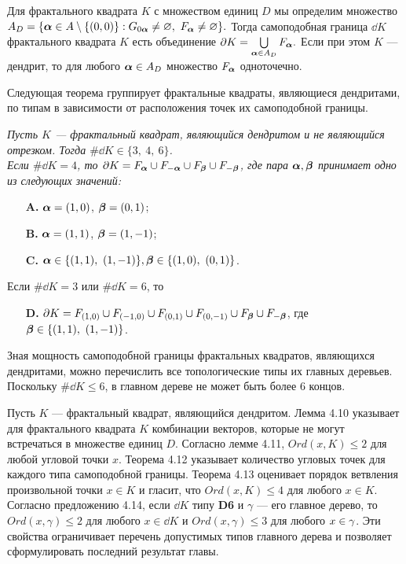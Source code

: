 \documentclass[a5paper,9pt,twoside]{extarticle} %
\begin{document}
Для фрактального квадрата $K$ с множеством единиц $D$ мы определим множество 
$A_D=\{{\bm{\alpha}}\in A\setminus\{(0,0)\}: G_{0{\bm{\alpha}}}\neq\varnothing,\ F_{\bm{\alpha}}\neq\varnothing\}.$
Тогда самоподобная граница $\dd K$ фрактального квадрата $K$ есть объединение
$\partial K=\bigcup\limits_{{\bm{\alpha}}\in A_D}F_{\bm{\alpha}}.$
Если при этом $K$ --- дендрит, то для любого ${\bm{\alpha}}\in A_D$ множество $F_{\bm{\alpha}}$ одноточечно.

Следующая теорема группирует фрактальные квадраты, являющиеся дендритами, по типам в зависимости от расположения точек их самоподобной границы.\\

{\em Пусть $K$ --- фрактальный квадрат, являющийся дендритом и не являющийся отрезком.
Тогда $\#\dd K\in\{3,\ 4,\ 6\}$. \\
Если $\#\dd K=4$, то  $\partial K=F_{\bm{\alpha}}\cup F_{-{\bm{\alpha}}}\cup F_{\bm{\beta}}\cup F_{-{\bm{\beta}}}$, где   пара  ${\bm{\alpha}},{\bm{\beta}}$ принимает одно из следующих значений:
\begin{itemize}[nolistsep]
	\item[{\bf A.}] ${\bm{\alpha}}=(1,0)$, $ {\bm{\beta}}=(0,1)$;
	\item[{\bf B.}] ${\bm{\alpha}}=(1,1)$, $ {\bm{\beta}}=(1,-1)$;
	\item[{\bf C.}] $\bma\in\{(1,1),\ (1,-1)\},\bmb\in\{(1,0),\ (0,1)\}$.
\end{itemize}
Если $\#\dd K=3$ или $\#\dd K=6$, то 
\begin{itemize}[nolistsep]
	\item[{\bf D.}] $\partial K=F_{(1,0)}\cup F_{(-1,0)}\cup F_{(0,1)}\cup F_{(0,-1)}\cup F_{\bm{\beta}}\cup F_{-{\bm{\beta}}}$, где ${\bm{\beta}}\in\{(1,1),\ (1,-1)\}$.
\end{itemize}}

Зная мощность самоподобной границы фрактальных квадратов, являющихся дендритами, можно перечислить все топологические типы их главных деревьев.
Поскольку $\#\dd K\leq6$, в главном дереве не может быть более 6 концов.

Пусть $K$ --- фрактальный квадрат, являющийся дендритом.
Лемма 4.10 указывает для фрактального квадрата $K$ комбинации векторов, которые не могут встречаться в множестве единиц $D$.
Согласно лемме 4.11, $Ord(x,K)\leq 2$ для любой угловой точки $x$.
Теорема 4.12 указывает количество угловых точек для каждого типа самоподобной границы.
Теорема 4.13 оценивает порядок ветвления произвольной точки $x\in K$ и гласит, что $Ord(x,K)\leq 4$ для любого $x\in K$.
Согласно предложению 4.14, если $\dd K$ типу {\bf D6} и $\gamma$ --- его главное дерево, то $Ord(x,\gamma)\leq2$ для любого $x\in\dd K$ и $Ord(x,\gamma)\leq3$ для любого $x\in\gamma$.
Эти свойства ограничивает перечень допустимых типов главного дерева и позволяет сформулировать последний результат главы.\\
\end{document}

